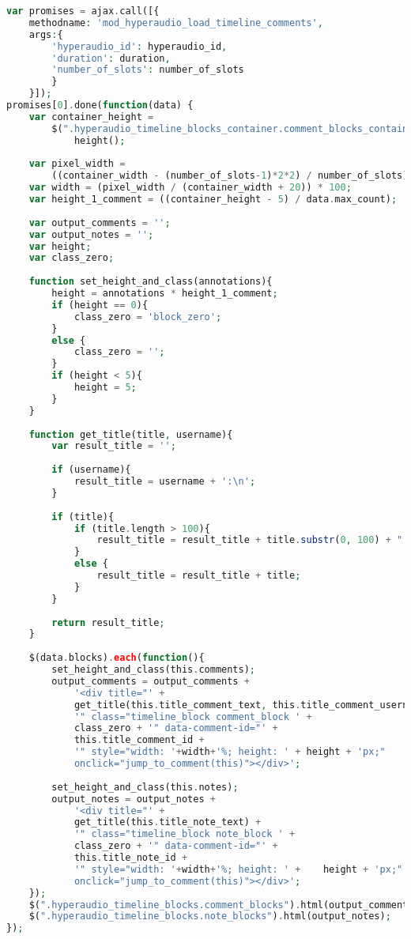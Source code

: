 \begin{lstlisting}[language=php,
             linewidth=\textwidth,
             caption={Ausschnitt der \textbf{hyperaudio.js} in der 9. Iteration},
             label={lst:it9:hyperaudio}]
var promises = ajax.call([{
    methodname: 'mod_hyperaudio_load_timeline_comments',
    args:{
        'hyperaudio_id': hyperaudio_id,
        'duration': duration,
        'number_of_slots': number_of_slots
        }
    }]);
promises[0].done(function(data) {
    var container_height =
        $(".hyperaudio_timeline_blocks_container.comment_blocks_container").
            height();
		    	
    var pixel_width = 
        ((container_width - (number_of_slots-1)*2*2) / number_of_slots);
    var width = (pixel_width / (container_width + 20)) * 100;
    var height_1_comment = ((container_height - 5) / data.max_count);
		    	
    var output_comments = '';
    var output_notes = '';
    var height;
    var class_zero;
		    	
    function set_height_and_class(annotations){
        height = annotations * height_1_comment;
        if (height == 0){
            class_zero = 'block_zero';
        }
        else {
            class_zero = '';
        }
        if (height < 5){
            height = 5;
        }
    }
		    	
    function get_title(title, username){
        var result_title = '';
		    		
        if (username){
            result_title = username + ':\n';
        }
		    		
        if (title){
            if (title.length > 100){
                result_title = result_title + title.substr(0, 100) + " ...";
            }
            else {
                result_title = result_title + title;
            }
        }
		    		
        return result_title;
    }
		    	
    $(data.blocks).each(function(){
        set_height_and_class(this.comments);
        output_comments = output_comments + 
            '<div title="' + 
            get_title(this.title_comment_text, this.title_comment_username) +
            '" class="timeline_block comment_block ' + 
            class_zero + '" data-comment-id="' + 
            this.title_comment_id + 
            '" style="width: '+width+'%; height: ' + height + 'px;"
            onclick="jump_to_comment(this)"></div>';
                
        set_height_and_class(this.notes);
        output_notes = output_notes +
            '<div title="' +
            get_title(this.title_note_text) + 
            '" class="timeline_block note_block ' +
            class_zero + '" data-comment-id="' +
            this.title_note_id + 
            '" style="width: '+width+'%; height: ' +	height + 'px;"
            onclick="jump_to_comment(this)"></div>';
    });
    $(".hyperaudio_timeline_blocks.comment_blocks").html(output_comments);
    $(".hyperaudio_timeline_blocks.note_blocks").html(output_notes);
});
\end{lstlisting}
